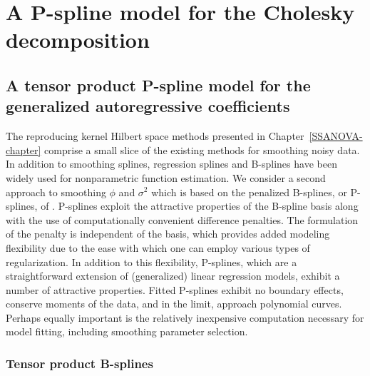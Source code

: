 
\chapter{A P-spline model for the Cholesky decomposition} \label{psplines-chapter}

\section{A tensor product P-spline model for the generalized autoregressive coefficients}


The reproducing kernel Hilbert space methods presented in Chapter~\ref{SSANOVA-chapter} comprise a small slice of the existing methods for smoothing noisy data. In addition to smoothing splines, regression splines \cite{eubank1999nonparametric} and B-splines \cite{de1978practical}  have been widely used for nonparametric function estimation. We consider a second approach to smoothing $\phi$ and $\sigma^2$ which is based on the penalized B-splines, or P-splines, of \cite{eilers1996flexible}. P-splines exploit the attractive properties of the B-spline basis along with the use of computationally convenient difference penalties. The formulation of the penalty is independent of the basis, which provides added modeling flexibility due to the ease with which one can employ various types of regularization. In addition to this flexibility, P-splines, which are a straightforward extension of (generalized) linear regression models, exhibit a number of attractive properties. Fitted P-splines exhibit no boundary effects, conserve moments of the data, and in the limit, approach polynomial curves. Perhaps equally important is the relatively inexpensive computation necessary for model fitting, including smoothing parameter selection.

\subsection{Tensor product B-splines}

